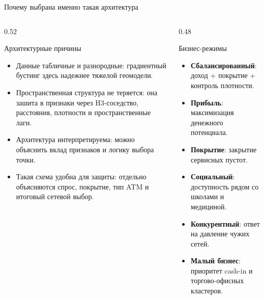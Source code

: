 \documentclass[aspectratio=169,12pt]{beamer}
\begin{document}
\begin{frame}{Почему выбрана именно такая архитектура}
\footnotesize
\begin{columns}[T]
\begin{column}{0.52\textwidth}
\begin{block}{Архитектурные причины}
\begin{itemize}
\item Данные табличные и разнородные: градиентный бустинг здесь надежнее тяжелой геомодели.
\item Пространственная структура не теряется: она зашита в признаки через H3-соседство, расстояния, плотности и пространственные лаги.
\item Архитектура интерпретируема: можно объяснить вклад признаков и логику выбора точки.
\item Такая схема удобна для защиты: отдельно объясняются спрос, покрытие, тип ATM и итоговый сетевой выбор.
\end{itemize}
\end{block}
\end{column}
\begin{column}{0.48\textwidth}
\begin{block}{Бизнес-режимы}
\begin{itemize}
\item \textbf{Сбалансированный}: доход + покрытие + контроль плотности.
\item \textbf{Прибыль}: максимизация денежного потенциала.
\item \textbf{Покрытие}: закрытие сервисных пустот.
\item \textbf{Социальный}: доступность рядом со школами и медициной.
\item \textbf{Конкурентный}: ответ на давление чужих сетей.
\item \textbf{Малый бизнес}: приоритет cash-in и торгово-офисных кластеров.
\end{itemize}
\end{block}
\end{column}
\end{columns}
\end{frame}
\end{document}
